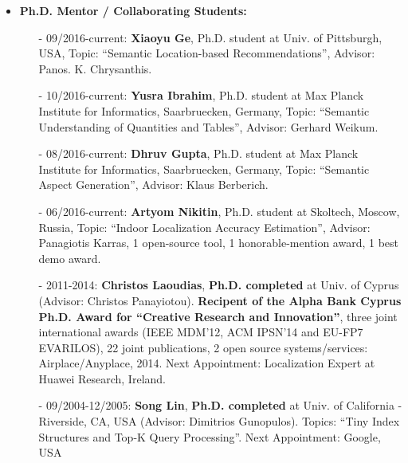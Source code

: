 \documentclass[10pt]{article}
\begin{document}
\begin{itemize}
    \item {\bf Ph.D. Mentor / Collaborating Students:}
    \begin{itemize}
    \setlength{\itemsep}{0.10ex}
        \item[-] 09/2016-current: {\bf Xiaoyu Ge}, Ph.D. student at Univ. of Pittsburgh, USA, Topic: ``Semantic Location-based  Recommendations'', Advisor: Panos. K. Chrysanthis.
        \item[-] 10/2016-current: {\bf Yusra Ibrahim}, Ph.D. student at Max Planck Institute for Informatics, Saarbruecken, Germany, Topic: ``Semantic Understanding of Quantities and Tables'', Advisor: Gerhard Weikum.
        \item[-] 08/2016-current: {\bf Dhruv Gupta}, Ph.D. student at Max Planck Institute for Informatics, Saarbruecken, Germany, Topic: ``Semantic Aspect Generation'', Advisor: Klaus Berberich.
        \item[-] 06/2016-current: {\bf Artyom Nikitin}, Ph.D. student at Skoltech, Moscow, Russia, Topic: ``Indoor Localization Accuracy Estimation'', Advisor: Panagiotis Karras, 1 open-source tool, 1 honorable-mention award, 1 best demo award.
\item[-] 2011-2014: {\bf Christos Laoudias}, {\bf Ph.D. completed} at Univ. of Cyprus (Advisor: Christos Panayiotou). {\bf Recipent of the Alpha Bank Cyprus Ph.D. Award for ``Creative Research and Innovation''}, three joint international awards (IEEE MDM'12, ACM IPSN'14 and EU-FP7 EVARILOS), 22 joint publications, 2 open source systems/services: Airplace/Anyplace, 2014. Next Appointment: Localization Expert at Huawei Research, Ireland.
        \item[-] 09/2004-12/2005: {\bf Song Lin}, {\bf Ph.D. completed} at Univ. of California - Riverside, CA, USA  (Advisor: Dimitrios Gunopulos). Topics: ``Tiny Index Structures and Top-K Query Processing''. Next Appointment: Google, USA
    \end{itemize}

    \newpage


\end{itemize}
\end{document}
